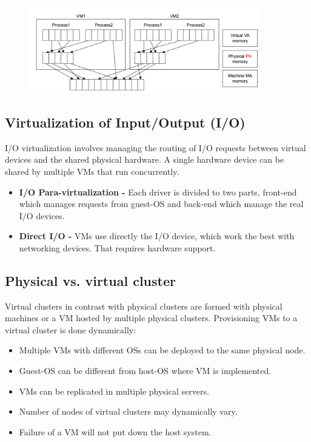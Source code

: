 \documentclass[12pt]{report}
\begin{document}
\begin{figure}[ht]
		\centering
           \includegraphics[width=0.9\textwidth]{virtmem.png}
         \caption{}
         \label{virtmem}
\end{figure} 

\subsection{Virtualization of Input/Output (I/O)}
I/O virtualization involves managing the routing of I/O requests between virtual devices and the shared physical hardware. A single hardware device can be shared by multiple VMs that run concurrently. 

\begin{itemize}
\item \textbf{I/O Para-virtualization -}
		Each driver is divided to two parts, front-end which manages requests from guest-OS and back-end which manage the real I/O devices.
\item \textbf{Direct I/O -}
		VMs use directly the I/O device, which work the best with networking devices. That requires hardware support.
\end{itemize}

\subsection*{Physical vs. virtual cluster}
Virtual clusters in contrast with physical clusters are formed with physical machines or a VM hosted by multiple physical clusters. Provisioning VMs to a virtual cluster is done dynamically:
\begin{itemize}
\item Multiple VMs with different OSs can be deployed to the same physical node.
\item Guest-OS can be different from host-OS where VM is implemented.
\item VMs can be replicated in multiple physical servers.
\item Number of nodes of virtual clusters may dynamically vary.
\item Failure of a VM will not put down the host system.
\end{itemize}
\end{document}
